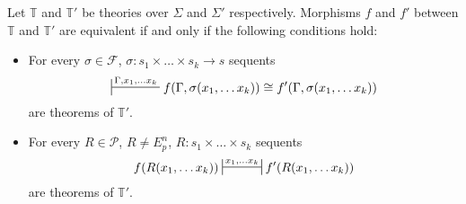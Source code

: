 \documentclass[reqno]{amsart}
\theoremstyle{definition}
\theoremstyle{remark}
\numberwithin{figure}{section}
\begin{document}
\begin{prop}
Let $\mathbb{T}$ and $\mathbb{T}'$ be theories over $\Sigma$ and $\Sigma'$ respectively.
Morphisms $f$ and $f'$ between $\mathbb{T}$ and $\mathbb{T}'$ are equivalent if and only if the following conditions hold:
\begin{itemize}
\item For every $\sigma \in \mathcal{F}$, $\sigma : s_1 \times \ldots \times s_k \to s$ sequents
\[ \sststile{}{\Gamma, x_1, \ldots x_k} f(\Gamma, \sigma(x_1, \ldots x_k)) \cong f'(\Gamma, \sigma(x_1, \ldots x_k)) \]
are theorems of $\mathbb{T}'$.
\item For every $R \in \mathcal{P}$, $R \neq E^n_p$, $R : s_1 \times \ldots \times s_k$ sequents
\[ f(R(x_1, \ldots x_k)) \ssststile{}{x_1, \ldots x_k} f'(R(x_1, \ldots x_k)) \]
are theorems of $\mathbb{T}'$.
\end{itemize}
\end{prop}
\end{document}
